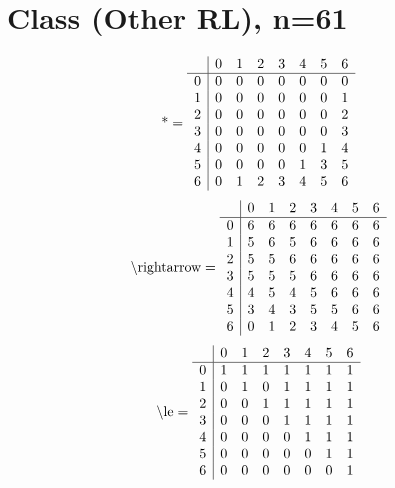 \documentclass[11pt]{article}
\begin{document}
\section{Class (Other RL), n=61}
\[\text{*} = 
\begin{array}{r | r r r r r r r}
 & 0 & 1 & 2 & 3 & 4 & 5 & 6 \\ \hline
0 & 0 & 0 & 0 & 0 & 0 & 0 & 0 \\
1 & 0 & 0 & 0 & 0 & 0 & 0 & 1 \\
2 & 0 & 0 & 0 & 0 & 0 & 0 & 2 \\
3 & 0 & 0 & 0 & 0 & 0 & 0 & 3 \\
4 & 0 & 0 & 0 & 0 & 0 & 1 & 4 \\
5 & 0 & 0 & 0 & 0 & 1 & 3 & 5 \\
6 & 0 & 1 & 2 & 3 & 4 & 5 & 6 \\
\end{array}
\]
\[\text{\textbackslash rightarrow} = 
\begin{array}{r | r r r r r r r}
 & 0 & 1 & 2 & 3 & 4 & 5 & 6 \\ \hline
0 & 6 & 6 & 6 & 6 & 6 & 6 & 6 \\
1 & 5 & 6 & 5 & 6 & 6 & 6 & 6 \\
2 & 5 & 5 & 6 & 6 & 6 & 6 & 6 \\
3 & 5 & 5 & 5 & 6 & 6 & 6 & 6 \\
4 & 4 & 5 & 4 & 5 & 6 & 6 & 6 \\
5 & 3 & 4 & 3 & 5 & 5 & 6 & 6 \\
6 & 0 & 1 & 2 & 3 & 4 & 5 & 6 \\
\end{array}
\]
\[\text{\textbackslash le} = 
\begin{array}{r | r r r r r r r}
 & 0 & 1 & 2 & 3 & 4 & 5 & 6 \\ \hline
0 & 1 & 1 & 1 & 1 & 1 & 1 & 1 \\
1 & 0 & 1 & 0 & 1 & 1 & 1 & 1 \\
2 & 0 & 0 & 1 & 1 & 1 & 1 & 1 \\
3 & 0 & 0 & 0 & 1 & 1 & 1 & 1 \\
4 & 0 & 0 & 0 & 0 & 1 & 1 & 1 \\
5 & 0 & 0 & 0 & 0 & 0 & 1 & 1 \\
6 & 0 & 0 & 0 & 0 & 0 & 0 & 1 \\
\end{array}
\]
\end{document}
